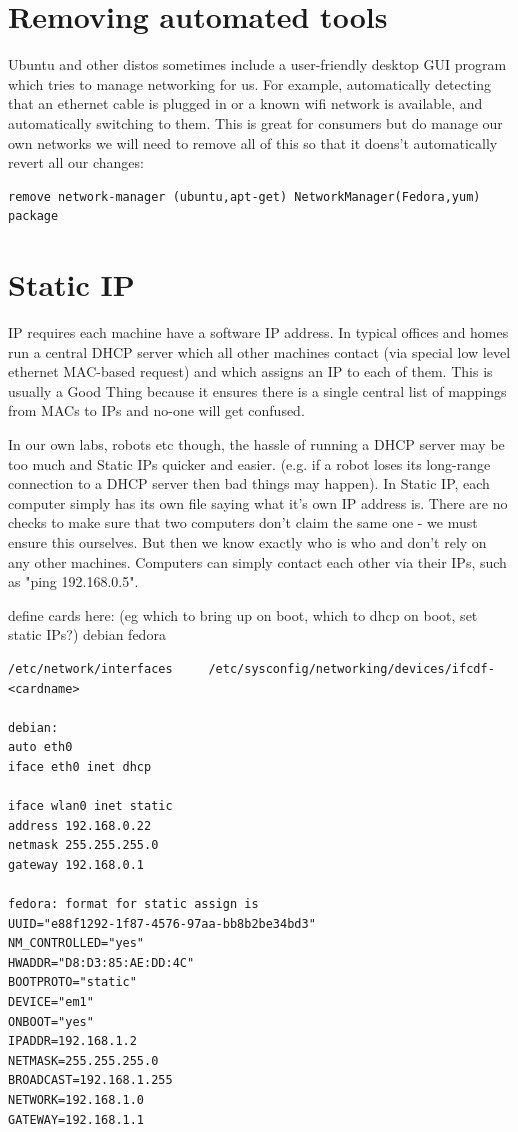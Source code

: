 \documentclass[oneside,english]{scrbook}
\begin{document}
\section{Removing automated tools}
Ubuntu and other distos sometimes include a user-friendly desktop GUI program which tries to manage networking for us. For example, automatically detecting that an ethernet cable is plugged in or a known wifi network is available, and automatically switching to them.  This is great for consumers but do manage our own networks we will need to remove all of this so that it doens't automatically revert all our changes:

\begin{lstlisting}
remove network-manager (ubuntu,apt-get) NetworkManager(Fedora,yum) package 
\end{lstlisting}
  

\section{Static IP}

IP requires each machine have a software IP address.  In typical offices and homes run a central DHCP server which all other machines contact (via special low level ethernet MAC-based request) and which assigns an IP to each of them.  This is usually a Good Thing because it ensures there is a single central list of mappings from MACs to IPs and no-one will get confused.  

In our own labs, robots etc though, the hassle of running a DHCP server may be too much and Static IPs quicker and easier.  (e.g. if a robot loses its long-range connection to a DHCP server then bad things may happen).   In Static IP, each computer simply has its own file saying what it's own IP address is.  There are no checks to make sure that two computers don't claim the same one - we must ensure this ourselves.  But then we know exactly who is who and don't rely on any other machines.  Computers can simply contact each other via their IPs, such as "ping 192.168.0.5".

define cards here:   (eg which to bring up on boot, which to dhcp on boot, set static IPs?) 
debian              fedora 
\begin{lstlisting}
/etc/network/interfaces     /etc/sysconfig/networking/devices/ifcdf-<cardname>  

debian:
auto eth0
iface eth0 inet dhcp 

iface wlan0 inet static
address 192.168.0.22
netmask 255.255.255.0
gateway 192.168.0.1

fedora: format for static assign is 
UUID="e88f1292-1f87-4576-97aa-bb8b2be34bd3" 
NM_CONTROLLED="yes" 
HWADDR="D8:D3:85:AE:DD:4C" 
BOOTPROTO="static"
DEVICE="em1"
ONBOOT="yes"
IPADDR=192.168.1.2
NETMASK=255.255.255.0
BROADCAST=192.168.1.255
NETWORK=192.168.1.0
GATEWAY=192.168.1.1
    
\end{lstlisting}
\end{document}
